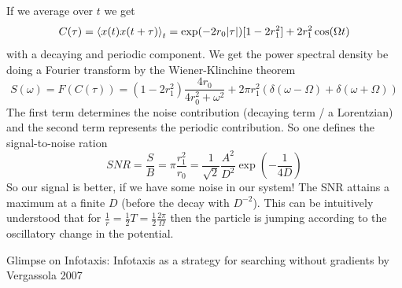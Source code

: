 \documentclass{notebook}
\begin{document}
If we average over $t$ we get
%
\begin{equation}
	C(\tau) = 	\expval{x(t) x(t+\tau)}_t = \exp(-2r_0 |\tau|) [1 - 2 r_1^2] + 2 r_1^2 \cos(\Omega t)
\end{equation}
%
with a decaying and periodic component. We get the power spectral density be doing a Fourier transform by the Wiener-Klinchine theorem
%
\begin{equation}
S(\omega) = F(C(\tau)) = (1- 2 r_1^2) \frac{4 r_0}{4 r_0^2 + \omega^2} + 2 \pi r_1^2 (\delta(\omega-\Omega) + \delta(\omega + \Omega))
\end{equation}
%
The first term determines the noise contribution (decaying term / a Lorentzian) and the second term represents the periodic contribution. So one defines the signal-to-noise ration
%
\begin{equation}
SNR = \frac{S}{B} = \pi \frac{r_1^2}{r_0} = \frac{1}{\sqrt{2}} \frac{A^2}{D^2} \exp(-\frac{1}{4 D})
\end{equation}
%
So our signal is better, if we have some noise in our system! The SNR attains a maximum at a finite $D$ (before the decay with $D^{-2}$). This can be intuitively understood that for $\frac{1}{r} = \frac{1}{2} T = \frac{1}{2} \frac{2 \pi}{\Omega}$ then the particle is jumping according to the oscillatory change in the potential. 

Glimpse on Infotaxis: Infotaxis as a strategy for searching without gradients by Vergassola 2007
\end{document}
